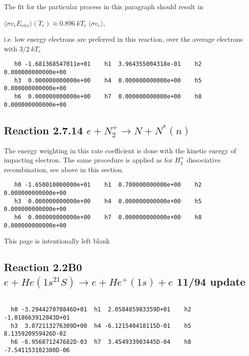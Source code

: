 \documentclass[12pt,dvipdfmx]{article}
\begin{document}
The fit for the particular process in this paragraph should result in

$\langle\sigma v_e E_{elec}\rangle(T_e) \approx 0.896 ~kT_e ~\langle\sigma v_e\rangle$,

i.e. low energy electrons are preferred in this reaction,
over the average electrons with $3/2~kT_e$


\begin{small}\begin{verbatim}
   h0 -1.681368547011e+01    h1  3.964355004318e-01    h2  0.000000000000e+00
   h3  0.000000000000e+00    h4  0.000000000000e+00    h5  0.000000000000e+00
   h6  0.000000000000e+00    h7  0.000000000000e+00    h8  0.000000000000e+00

\end{verbatim}\end{small}

\subsection{
Reaction 2.7.14   $e + N_2^+ \rightarrow N + N^*(n) $
}
The energy weighting in this rate coefficient is done with the kinetic energy of
impacting electron. The same procedure is applied as for $H_2^+$ dissociative recombination, see above in this section.

\begin{small}\begin{verbatim}
   h0 -1.650010000000e+01    h1  0.700000000000e+00    h2  0.000000000000e+00
   h3  0.000000000000e+00    h4  0.000000000000e+00    h5  0.000000000000e+00
   h6  0.000000000000e+00    h7  0.000000000000e+00    h8  0.000000000000e+00

\end{verbatim}\end{small}
\newpage
This page is intentionally left blank
\newpage


\subsection{
Reaction 2.2B0 $e + He(1s^21S) \rightarrow e + He^+(1s) + e $ 11/94 update
}

\begin{small}\begin{verbatim}

  h0 -3.294427070846D+01  h1  2.058485983359D+01    h2 -1.018663912043D+01
  h3  3.072113276309D+00  h4 -6.121540418115D-01    h5  8.135920959426D-02
  h6 -6.956871247682D-03  h7  3.454933903445D-04    h8 -7.541153102380D-06
\end{verbatim}\end{small}
\end{document}
